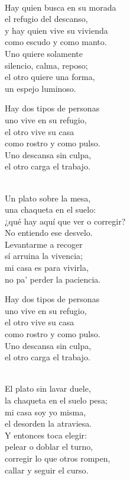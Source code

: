 \begin{lyrics}


\\
Hay quien busca en su morada\\
el refugio del descanso,\\
y hay quien vive su vivienda\\
como escudo y como manto.\\
Uno quiere solamente\\
silencio, calma, reposo;\\
el otro quiere una forma,\\
un espejo luminoso.

 Hay dos tipos de personas\\
 uno vive en su refugio,\\
el otro vive su casa\\
como rostro y como pulso.\\
 Uno descansa sin culpa,\\
el otro carga el trabajo.

\\
Un plato sobre la mesa,\\
una chaqueta en el suelo:\\
¿qué hay aquí que ver o corregir?\\
No entiendo ese desvelo.\\
Levantarme a recoger\\
sí arruina la vivencia;\\
mi casa es para vivirla,\\
no pa' perder la paciencia.

 Hay dos tipos de personas\\
 uno vive en su refugio,\\
el otro vive su casa\\
como rostro y como pulso.\\
 Uno descansa sin culpa,\\
el otro carga el trabajo.

\\
El plato sin lavar duele,\\
la chaqueta en el suelo pesa;\\
mi casa soy yo misma,\\
el desorden la atraviesa.\\
Y entonces toca elegir:\\
pelear o doblar el turno,\\
corregir lo que otros rompen,\\
callar y seguir el curso.


\end{lyrics}
